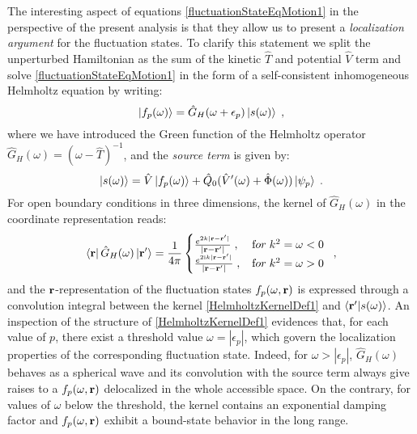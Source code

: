 \documentclass[reprint,aps,prb]{revtex4-1}
\renewcommand{\r}{{\bf r}}
\newcommand{\eps}{\epsilon}
\newcommand{\ii}{\mathrm{i}}
\newcommand{\be}{\begin{equation}}
\newcommand{\ee}{\end{equation}}
\newcommand{\nn}{\notag}
\newcommand{\lb}{\label}
\newcommand{\op}[1]{\hat {#1}}
\newcommand{\brket}[2]{\langle  #1 | #2 \rangle} %
\begin{document}
The interesting aspect of equations \eqref{fluctuationStateEqMotion1} in the perspective of the present analysis is that they allow us to present a 
\emph{localization argument} for the fluctuation states. To clarify this statement we split the unperturbed Hamiltonian as the sum of the kinetic $\op T$ and potential 
$\op V$ term and solve \eqref{fluctuationStateEqMotion1} in the form of a self-consistent inhomogeneous Helmholtz equation by writing:
\be
\ket{f_p(\omega)} = \op G_H(\omega+\epsilon_p)\ket{s(\omega)} \;,
\ee
where we have introduced the Green function of the Helmholtz operator $\op G_H(\omega) = (\omega-\op T)^{-1}$, %
and the \emph{source term} is given by:
\be
\ket{s(\omega)} =  \op V\ket{f_p(\omega)} + \op Q_0(\op V'(\omega) + \op \Phi(\omega))\ket{\psi_p} \;.\nn
\ee
For open boundary conditions in three dimensions, the kernel of $\op G_H(\omega)$ in the coordinate representation reads: 
\be\lb{HelmholtzKernelDef1}
\bra{\r} \op G_H(\omega) \ket{\r'} = \frac{1}{4\pi} \begin{cases}
\frac{e^{2k|\r - \r' |}}{|\r- \r' |} \;,\; & {\textrm for}\; k^2 = \omega  < 0\; \\ 
\frac{e^{2\ii k |\r-\r' |}}{|\r-\r' |} \;, & {\textrm for} \; k^2 = \omega > 0
\end{cases} \;,
\ee
and the $\r$-representation of the fluctuation states $f_p(\omega,\r)$ is expressed through a convolution integral between the kernel \eqref{HelmholtzKernelDef1} and
$\brket{\r'}{s(\omega)}$.
An inspection of the structure of \eqref{HelmholtzKernelDef1} evidences that, for each value of $p$, there exist a threshold value $\omega = |\eps_p|$, 
which govern the localization properties of the corresponding fluctuation state. Indeed, for $\omega > |\eps_p|$,  $\op G_H(\omega)$ behaves as a spherical wave and its
convolution with the source term always give raises to a $f_p(\omega,\r)$ delocalized in the whole accessible space. On the contrary, for values of $\omega$ below the threshold,
the kernel contains an exponential damping factor and %
$f_p(\omega,\r)$ exhibit a bound-state behavior in the long range.   
\end{document}
